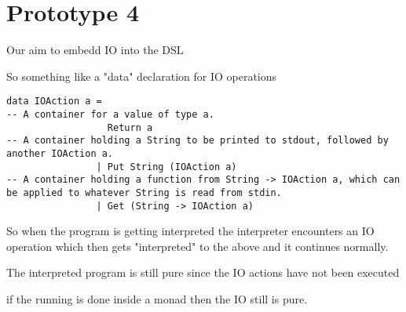 \documentclass[thesis-solanki.tex]{subfiles}
\begin{document}
\chapter{Prototype 4}{\label{proto4}}


Our aim to embedd IO into the DSL

So something like a "data" declaration for IO operations

\begin{verbatim}
data IOAction a = 
-- A container for a value of type a.
                  Return a 
-- A container holding a String to be printed to stdout, followed by another IOAction a.
                | Put String (IOAction a) 
-- A container holding a function from String -> IOAction a, which can be applied to whatever String is read from stdin.
                | Get (String -> IOAction a)
\end{verbatim}

So when the program is getting interpreted the interpreter encounters an IO operation which then gets "interpreted" to the above and it 
continues normally.

The interpreted program is still pure since the IO actions have not been executed 

if the running is done inside a monad then the IO still is pure.
\end{document}
